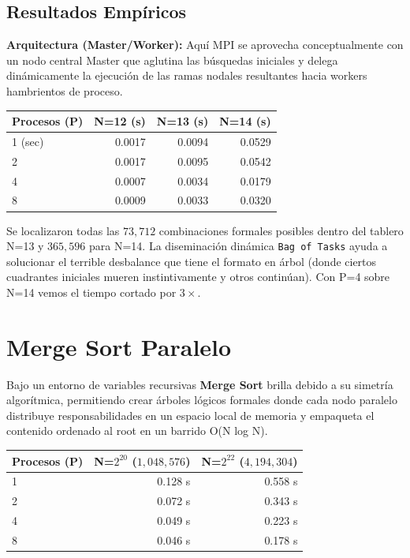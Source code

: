 \documentclass[11pt,a4paper]{article}
\begin{document}
\subsection*{Resultados Empíricos}
\textbf{Arquitectura (Master/Worker):} Aquí MPI se aprovecha conceptualmente con un nodo central Master que aglutina las búsquedas iniciales y delega dinámicamente la ejecución de las ramas nodales resultantes hacia workers hambrientos de proceso.

\begin{center}
\begin{tabular}{|l|r|r|r|}
\hline
\textbf{Procesos (P)} & \textbf{N=12 (s)} & \textbf{N=13 (s)} & \textbf{N=14 (s)}\\
\hline
1 (sec) & 0.0017 & 0.0094 & 0.0529 \\
2       & 0.0017 & 0.0095 & 0.0542 \\
4       & 0.0007 & 0.0034 & 0.0179 \\
8       & 0.0009 & 0.0033 & 0.0320 \\
\hline
\end{tabular}
\end{center}
Se localizaron todas las $73,712$ combinaciones formales posibles dentro del tablero N=13 y $365,596$ para N=14. La diseminación dinámica \texttt{Bag of Tasks} ayuda a solucionar el terrible desbalance que tiene el formato en árbol (donde ciertos cuadrantes iniciales mueren instintivamente y otros continúan). Con P=4 sobre N=14 vemos el tiempo cortado por $3\times$.

\section{Merge Sort Paralelo}
Bajo un entorno de variables recursivas \textbf{Merge Sort} brilla debido a su simetría algorítmica, permitiendo crear árboles lógicos formales donde cada nodo paralelo distribuye responsabilidades en un espacio local de memoria y empaqueta el contenido ordenado al root en un barrido O(N log N).

\begin{center}
\begin{tabular}{|l|r|r|}
\hline
\textbf{Procesos (P)} & \textbf{N=$2^{20}$} ($1,048,576$) & \textbf{N=$2^{22}$} ($4,194,304$) \\
\hline
1 & 0.128 s & 0.558 s \\
2 & 0.072 s & 0.343 s \\
4 & 0.049 s & 0.223 s \\
8 & 0.046 s & 0.178 s \\
\hline
\end{tabular}
\end{center}
\end{document}
